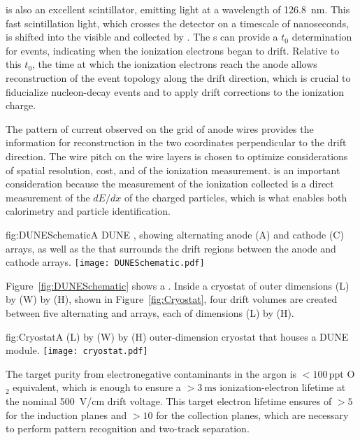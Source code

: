  is also an excellent scintillator, emitting  light at a wavelength of \SI{126.8}{\nano\meter}. This fast scintillation light, which crosses the detector on a timescale of nanoseconds, is shifted into the visible and collected by . The s can provide a $t_{0}$ determination for events, indicating when the ionization electrons began to drift. Relative to this $t_{0}$, the time at which the ionization electrons reach the anode allows reconstruction of the event topology along the drift direction, which is crucial to fiducialize nucleon-decay events and to apply drift corrections to the ionization charge.

The pattern of current observed on the grid of anode wires provides the information for reconstruction in the two coordinates perpendicular to the drift direction. The wire pitch on the wire layers is chosen to optimize considerations of  spatial resolution, cost, and  of the ionization measurement.  is an important consideration because the measurement of the ionization collected is a direct measurement of the $dE/dx$ of the charged particles, which is what enables both calorimetry and particle identification.


\begin{dunefigure}{fig:DUNESchematic}{A \nominalmodsize DUNE  , showing alternating anode (A) and cathode (C) arrays, as well as the  that surrounds the drift regions between the anode and cathode arrays.}
\texttt{[image: DUNESchematic.pdf]}
\end{dunefigure}

Figure~\ref{fig:DUNESchematic} shows a \nominalmodsize {}. Inside a cryostat of outer dimensions \cryostatlen (L) by \cryostatwdth (W) by \cryostatht{} (H), shown in Figure~\ref{fig:Cryostat}, four \spmaxdrift drift volumes are created between five alternating  and  arrays, each of dimensions \sptpclen (L) by \tpcheight (H).

\begin{dunefigure}{fig:Cryostat}{A  \cryostatlen (L) by \cryostatwdth (W) by \cryostatht{} (H) outer-dimension cryostat that houses a DUNE \nominalmodsize module.}
\texttt{[image: cryostat.pdf]}
\end{dunefigure}

The target purity from electronegative contaminants in the argon is $<\!\!100$\,ppt O$_{2}$ equivalent, which is enough to ensure a $>\!\!\SI{3}{\milli\second}$ ionization-electron lifetime at the nominal \SI{500}{\volt/\centi\meter} drift voltage. This target electron lifetime ensures  of $>5$ for the induction planes and $>10$ for the collection planes, which are necessary to perform pattern recognition and two-track separation. 

